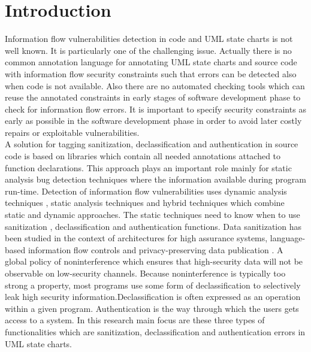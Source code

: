 \chapter{Introduction}
\label{chapter:Introduction}
Information flow vulnerabilities detection in code and UML state charts is not well known. It is particularly one of the
challenging issue. Actually there is no common annotation language for annotating UML state charts and source code with
information flow security constraints such that errors can be detected also when code is not available. Also there are
no automated checking tools which can reuse the annotated constraints in early stages of software development phase to check
for information flow errors. It is important to specify security constraints as early as possible in the software
development phase in order to avoid later costly repairs or exploitable vulnerabilities.\\

A solution for tagging sanitization, declassification and authentication in source code is based on libraries which contain all needed annotations attached to function declarations. This approach plays an important role mainly for static analysis bug detection techniques where the information available during program run-time. Detection of information flow vulnerabilities uses dynamic analysis techniques , static analysis techniques and hybrid techniques which combine static and dynamic approaches. The static techniques need to know when to use  sanitization , declassification and authentication functions. Data sanitization has been studied in the context of architectures for high assurance systems, language-based information flow controls and privacy-preserving data publication \cite{ref_1_gehani2011f}. A global policy of noninterference which ensures that high-security data will not be observable on low-security channels. Because noninterference is typically
too strong a property, most programs use some form of declassification to selectively leak high security  information\cite{ref_2_hicks2006trusted}.Declassification is often expressed as an operation within a given
program. Authentication is the way through which the users gets access to a system. In this research main focus are these three types of functionalities which are sanitization, declassification and authentication errors in UML state charts. \\

